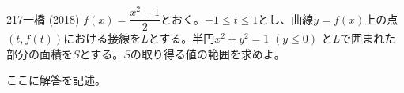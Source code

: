 \begin{thm}{217}{}{一橋 (2018)}
 $f(x)=\dfrac{x^2-1}{2}$とおく。$-1\le t \le 1$とし、曲線$y=f(x)$上の点$\left(t,f(t)\right)$における接線を$L$とする。半円$x^2+y^2=1$ $(y\le 0)$ と$L$で囲まれた部分の面積を$S$とする。$S$の取り得る値の範囲を求めよ。
\end{thm}

ここに解答を記述。